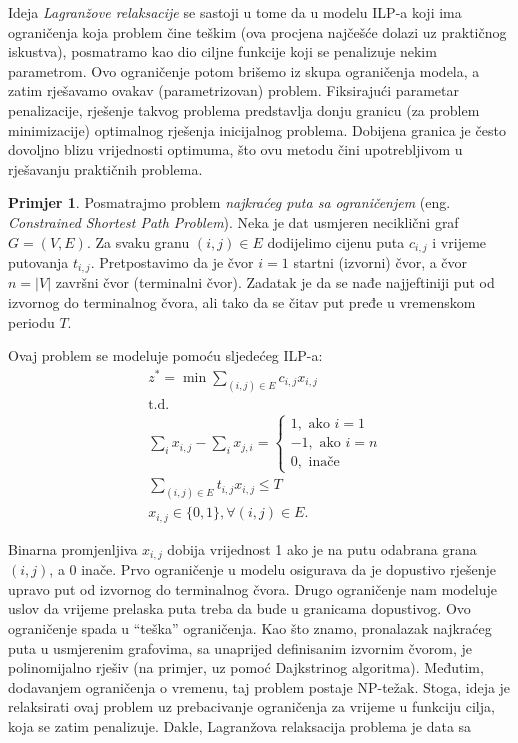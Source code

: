 \documentclass[a4paper, utf8, 11pt, colorlinks]{book}
\theoremstyle{definition}
\newtheorem{primjer}{Primjer}[chapter]
\begin{document}
Ideja \emph{Lagranžove relaksacije} se sastoji u tome da u modelu ILP-a  koji ima  ograničenja koja problem čine teškim (ova procjena najčešće dolazi uz praktičnog iskustva),  posmatramo kao dio ciljne funkcije koji se penalizuje nekim parametrom.  %
Ovo ograničenje potom brišemo iz skupa ograničenja modela, a zatim rješavamo ovakav (parametrizovan) problem. Fiksirajući parametar penalizacije, rješenje takvog problema predstavlja donju granicu (za problem minimizacije)  optimalnog rješenja inicijalnog problema. Dobijena granica je često dovoljno blizu vrijednosti optimuma, što ovu metodu čini upotrebljivom u rješavanju praktičnih problema. 

\begin{primjer} Posmatrajmo problem \emph{najkraćeg puta sa ograničenjem} (eng. \emph{Constrained Shortest Path Problem}). Neka je dat usmjeren neciklični graf $G=(V,E)$. Za svaku granu $(i,j) \in E$ dodijelimo cijenu puta $c_{i,j}$ i vrijeme putovanja $t_{i,j}$. Pretpostavimo da je čvor $i=1$ startni (izvorni) čvor, a čvor $n = |V|$   završni čvor (terminalni čvor). Zadatak je da se nađe najjeftiniji put  od izvornog do terminalnog čvora, ali tako da se čitav put pređe u vremenskom periodu $T$.
\end{primjer}
Ovaj problem se modeluje pomoću sljedećeg ILP-a:
 \begin{align}
    &z^*=\min\sum_{(i,j) \in E }c_{i,j}x_{i,j} \\
    &\mbox{t.d. }\\
    & \sum_{i} x_{i,j} - \sum_{i} x_{j,i} = \begin{cases}  
                                               1, \mbox{ ako } i=1 \\
                                              -1, \mbox{ ako } i=n \\
                                               0, \mbox{ inače }
                                            \end{cases} \\
    & \sum_{(i,j) \in E} t_{i,j} x_{i,j} \leq T \\
    & x_{i,j} \in \{0, 1 \}, \forall (i,j) \in E.
\end{align} 

Binarna promjenljiva $x_{i,j}$ dobija vrijednost 1 ako je  na   putu odabrana grana $(i,j)$, a 0 inače. 
Prvo ograničenje u modelu osigurava da je dopustivo rješenje upravo put od izvornog do terminalnog čvora. Drugo ograničenje nam modeluje uslov da vrijeme prelaska puta treba da bude u  granicama dopustivog. Ovo ograničenje spada u ``teška'' ograničenja. Kao što znamo,  pronalazak najkraćeg puta u usmjerenim grafovima, sa unaprijed definisanim izvornim čvorom, je polinomijalno rješiv (na primjer, uz pomoć Dajkstrinog algoritma). Međutim,  dodavanjem ograničenja o vremenu, taj problem postaje NP-težak. Stoga, ideja je  relaksirati ovaj problem uz prebacivanje ograničenja za vrijeme u funkciju cilja, koja se zatim penalizuje. 
Dakle, Lagranžova relaksacija problema je data sa
\end{document}
